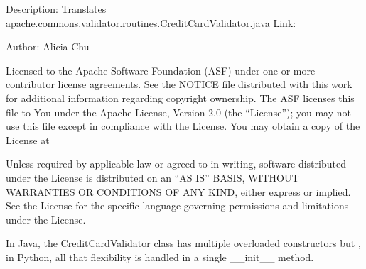 \documentclass[letterpaper,10pt,english]{sphinxmanual}
\begin{document}
\sphinxAtStartPar
Description: Translates apache.commons.validator.routines.CreditCardValidator.java
Link: 

\sphinxAtStartPar
Author: Alicia Chu
\begin{description}
\sphinxAtStartPar
Licensed to the Apache Software Foundation (ASF) under one or more
contributor license agreements. See the NOTICE file distributed with
this work for additional information regarding copyright ownership.
The ASF licenses this file to You under the Apache License, Version 2.0
(the “License”); you may not use this file except in compliance with
the License. You may obtain a copy of the License at
\begin{quote}

\sphinxAtStartPar
{}
\end{quote}

\sphinxAtStartPar
Unless required by applicable law or agreed to in writing, software
distributed under the License is distributed on an “AS IS” BASIS,
WITHOUT WARRANTIES OR CONDITIONS OF ANY KIND, either express or implied.
See the License for the specific language governing permissions and
limitations under the License.

\sphinxAtStartPar
In Java, the CreditCardValidator class has multiple overloaded constructors but
, in Python, all that flexibility is handled in a single \_\_init\_\_ method.

\end{description}
\end{document}
